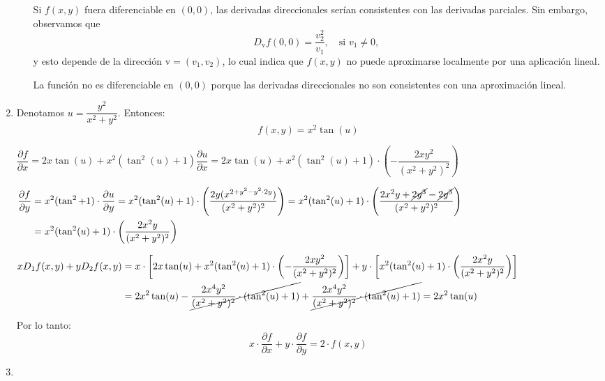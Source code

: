 \begin{enumerate}[label=\color{red}\textbf{\arabic*)}, leftmargin=*]
\begin{itemize}
	Si $f(x,y)$ fuera diferenciable en $(0,0)$, las derivadas direccionales serían consistentes con las derivadas parciales. Sin embargo, observamos que \[ D_{\mathrm{v}}f(0,0)=\dfrac{v_2^2}{v_1},\quad\text{si }v_1\neq0, \]y esto depende de la dirección $\mathrm{v}=(v_1,v_2)$, lo cual indica que $f(x,y)$ no puede aproximarse localmente por una aplicación lineal.
	
	La función no es diferenciable en $(0,0)$ porque las derivadas direccionales no son consistentes con una aproximación lineal.
\end{itemize}

\item {}

Denotamos $u=\dfrac{y^{2}}{x^2+y^2}$. Entonces: \[ f(x,y)=x^{2}\tan(u) \]

$\dfrac{\partial f}{\partial x}=2x\tan(u)+x^{2}(\tan^{2}(u)+1)\dfrac{\partial u}{\partial x}=2x\tan(u)+x^{2}(\tan^{2}(u)+1)\cdot\left(-\dfrac{2xy^{2}}{(x^{2}+y^{2})^{2}}\right)$

$\begin{aligned}
\dfrac{\partial f}{\partial y}&=x^{2}(\tan^{2}+1)\cdot\dfrac{\partial u}{\partial y}=x^{2}(\tan^{2}(u)+1)\cdot\left(\dfrac{2y(x^{2+y^{2}-y^{2}\cdot2y})}{(x^{2}+y^{2})^{2}}\right)=x^{2}(\tan^{2}(u)+1)\cdot\left(\dfrac{2x^{2}y+\cancel{2y^{3}}-\cancel{2y^{3}}}{(x^{2}+y^{2})^{2}}\right)\\
&=x^{2}(\tan^{2}(u)+1)\cdot\left(\dfrac{2x^{2}y}{(x^{2}+y^{2})^{2}}\right)
\end{aligned}$

$\begin{aligned}
xD_1f(x,y)+yD_2f(x,y)&=x\cdot\left[2x\tan(u)+x^{2}(\tan^{2}(u)+1)\cdot\left(-\dfrac{2xy^{2}}{(x^{2}+y^{2})^{2}}\right)\right]+y\cdot\left[x^{2}(\tan^{2}(u)+1)\cdot\left(\dfrac{2x^{2}y}{(x^{2}+y^{2})^{2}}\right)\right]\\
&=2x^{2}\tan(u)-\cancel{\dfrac{2x^{4}y^{2}}{(x^{2}+y^{2})^{2}}\cdot(\tan^{2}(u)+1)}+\cancel{\dfrac{2x^{4}y^{2}}{(x^{2}+y^{2})^{2}}\cdot(\tan^{2}(u)+1)} = 2x^{2}\tan(u)
\end{aligned}$

Por lo tanto: \[ x\cdot\dfrac{\partial f}{\partial x}+y\cdot\dfrac{\partial f}{\partial y}=2\cdot f(x,y) \]

\item {}


\end{enumerate}
